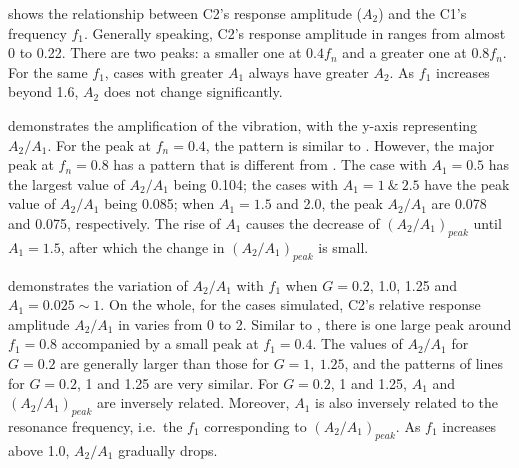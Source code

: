  shows the relationship between C2's response amplitude ($ A_2 $) and the C1's frequency $ f_1 $. Generally speaking, C2's response amplitude in  ranges from almost 0 to 0.22. There are two peaks: a smaller one at $ 0.4f_n $ and a greater one at $ 0.8f_n $. For the same $ f_1 $, cases with greater $ A_1 $ always have greater $ A_2 $. As $ f_1 $ increases beyond 1.6, $ A_2 $ does not change significantly.

 demonstrates the amplification of the vibration, with the y-axis representing $A_{2}/A_{1}$. For the peak at $f_{n} = 0.4$, the pattern is similar to . However, the major peak at $f_{n} = 0.8$ has a pattern that is different from . The case with $A_{1} = 0.5$ has the largest value of $A_{2}/A_{1}$ being 0.104; the cases with $A_{1}= 1\ \&\ 2.5$ have the peak value of $A_{2}/A_{1}$ being 0.085; when $A_{1} = 1.5$ and 2.0, the peak $A_{2}/A_{1}$ are 0.078 and 0.075, respectively. The rise of $A_{1}$ causes the decrease of $(A_{2}/A_{1})_{peak}$ until $A_{1} = 1.5$, after which the change in $(A_{2}/A_{1})_{peak}$ is small. 

 demonstrates the variation of $ A_2/A_1 $ with $ f_1 $ when $ G =0.2$, 1.0, 1.25 and $ A_1 =0.025 \sim 1$. On the whole, for the cases simulated, C2's relative response amplitude $ A_2/A_1 $ in  varies from 0 to 2. Similar to , there is one large peak around $ f_1 =0.8$ accompanied by a small peak at $ f_1 =0.4$. The values of $ A_2/A_1 $ for $ G =0.2 $ are generally larger than those for $ G =1,\ 1.25$, and the patterns of lines for $ G =0.2$, 1 and 1.25 are very similar. For $ G =0.2$, 1 and 1.25, $ A_1 $ and $ (A_2/A_1)_{peak} $ are inversely related. Moreover, $ A_1 $ is also inversely related to the resonance frequency, i.e.\ the $ f_1 $ corresponding to $ (A_2/A_1)_{peak} $. As $ f_1 $ increases above 1.0, $ A_2/A_1 $ gradually drops.


